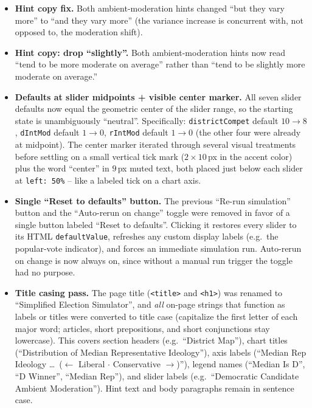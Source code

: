 \documentclass[11pt]{article}
\begin{document}
\begin{itemize}
        number input was removed, so the slider now runs the full row width
        like the other six sliders.
  \item \textbf{Hint copy fix.} Both ambient-moderation hints changed
        ``but they vary more'' to ``and they vary more'' (the variance
        increase is concurrent with, not opposed to, the moderation shift).
  \item \textbf{Hint copy: drop ``slightly''.} Both ambient-moderation hints
        now read ``tend to be more moderate on average'' rather than
        ``tend to be slightly more moderate on average.''
  \item \textbf{Defaults at slider midpoints + visible center marker.}
        All seven slider defaults now equal the geometric center of the
        slider range, so the starting state is unambiguously ``neutral''.
        Specifically: \texttt{districtCompet} default $10 \to 8$,
        \texttt{dIntMod} default $1 \to 0$, \texttt{rIntMod} default
        $1 \to 0$ (the other four were already at midpoint). The center
        marker iterated through several visual treatments before settling
        on a small vertical tick mark ($2 \times 10$\,px in the accent
        color) plus the word ``center'' in $9$\,px muted text, both
        placed just below each slider at \texttt{left: 50\%} -- like a
        labeled tick on a chart axis.
  \item \textbf{Single ``Reset to defaults'' button.} The previous
        ``Re-run simulation'' button and the ``Auto-rerun on change''
        toggle were removed in favor of a single button labeled
        ``Reset to defaults''. Clicking it restores every slider to its
        HTML \texttt{defaultValue}, refreshes any custom display labels
        (e.g.\ the popular-vote indicator), and forces an immediate
        simulation run. Auto-rerun on change is now always on, since
        without a manual run trigger the toggle had no purpose.
  \item \textbf{Title casing pass.} The page title (\texttt{<title>} and
        \texttt{<h1>}) was renamed to ``Simplified Election Simulator'',
        and \emph{all} on-page strings that function as labels or titles
        were converted to title case (capitalize the first letter of
        each major word; articles, short prepositions, and short
        conjunctions stay lowercase). This covers section headers
        (e.g.\ ``District Map''), chart titles (``Distribution of Median
        Representative Ideology''), axis labels (``Median Rep Ideology
        \ldots\ ($\leftarrow$ Liberal $\cdot$ Conservative $\rightarrow$)''),
        legend names (``Median Is D'', ``D Winner'', ``Median Rep''),
        and slider labels (e.g.\ ``Democratic Candidate Ambient
        Moderation''). Hint text and body paragraphs remain in
        sentence case.
\end{itemize}
\end{document}
